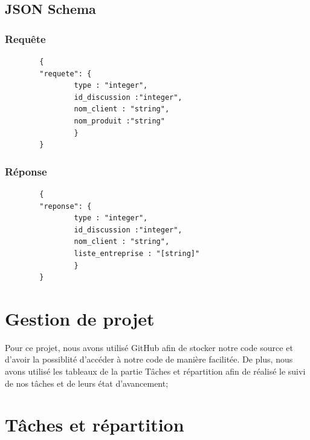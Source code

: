 \documentclass[a4paper, 11pt]{article}
\begin{document}
    \subsection{JSON Schema}
        \subsubsection{Requête}
        \begin{verbatim}
        {
        "requete": {
                type : "integer",
                id_discussion :"integer",
                nom_client : "string",
                nom_produit :"string"
                }
        }

        \end{verbatim}
        
        \subsubsection{Réponse}
        \begin{verbatim}
        {
        "reponse": {
                type : "integer",
                id_discussion :"integer",
                nom_client : "string",
                liste_entreprise : "[string]"
                }
        }
        \end{verbatim}

\section{Gestion de projet}
Pour ce projet, nous avons utilisé GitHub afin de stocker notre code source et d'avoir la possiblité d'accéder à notre code de manière facilitée. De plus, nous avons utilisé les tableaux de la partie Tâches et répartition afin de réalisé le suivi de nos tâches et de leurs état d'avancement;

\section{Tâches et répartition}
\end{document}
